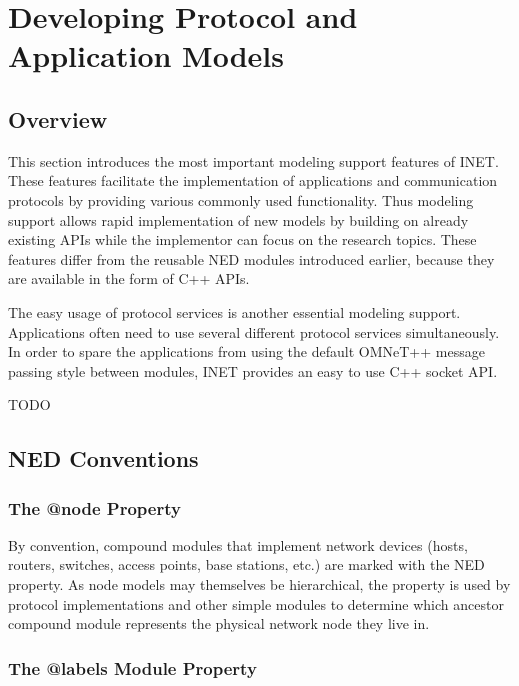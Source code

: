 \chapter{Developing Protocol and Application Models}
\label{cha:developing-models}

\section{Overview}

This section introduces the most important modeling support features of
INET. These features facilitate the implementation of applications and
communication protocols by providing various commonly used functionality.
Thus modeling support allows rapid implementation of new models by building
on already existing APIs while the implementor can focus on the research
topics. These features differ from the reusable NED modules introduced
earlier, because they are available in the form of C++ APIs.

The easy usage of protocol services is another essential modeling support.
Applications often need to use several different protocol services
simultaneously. In order to spare the applications from using the default
OMNeT++ message passing style between modules, INET provides an easy to use
C++ socket API.

 TODO
\section{NED Conventions}


\subsection{The @node Property}

By convention, compound modules that implement network devices (hosts,
routers, switches, access points, base stations, etc.) are marked with the
 NED property. As node models may themselves be hierarchical, the
 property is used by protocol implementations and other simple
modules to determine which ancestor compound module represents the physical
network node they live in.

\subsection{The @labels Module Property}

